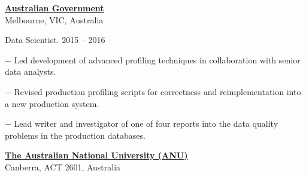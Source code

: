 \documentclass[10pt]{article}
\newcommand{\halfblankline}{\quad\vspace{-0.5\baselineskip}\pagebreak[3]}
\begin{document}
\halfblankline

\href{http://www.australia.gov.au/}{\textbf{Australian Government}}\\
Melbourne, VIC, Australia

\begin{outerlist}
	\item Data Scientist. \hfill {2015 -- 2016}
	\begin{innerlist}
		\item[$-$] Led development of advanced profiling techniques in collaboration with senior data analysts.
		\item[$-$] Revised production profiling scripts for correctness and reimplementation into a new production system.
		\item[$-$] Lead writer and investigator of one of four reports into the data quality problems in the production databases.
  \end{innerlist}
\end{outerlist}

\halfblankline

\href{http://www.anu.edu.au/}{\textbf{The Australian National University (ANU)}}\\
Canberra, ACT 2601, Australia
\end{document}
